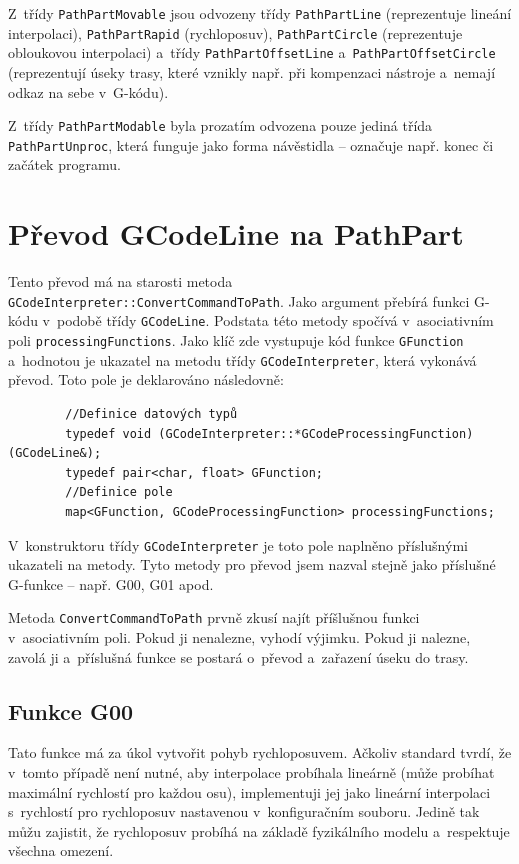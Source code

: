 		Z~třídy {\tt PathPartMovable} jsou odvozeny třídy {\tt PathPartLine} (reprezentuje lineání interpolaci), {\tt PathPartRapid} (rychloposuv), {\tt PathPartCircle} (reprezentuje obloukovou interpolaci) a~třídy {\tt PathPartOffsetLine} a~{\tt PathPartOffsetCircle} (reprezentují úseky trasy, které vznikly např. při kompenzaci nástroje a~nemají odkaz na sebe v~G-kódu).
		
		Z~třídy {\tt PathPartModable} byla prozatím odvozena pouze jediná třída {\tt PathPartUnproc}, která funguje jako forma návěstidla -- označuje např. konec či začátek programu.
	\section{Převod GCodeLine na PathPart}
		Tento převod má na starosti metoda {\tt GCodeInterpreter::ConvertCommandToPath}. Jako argument přebírá funkci G-kódu v~podobě třídy {\tt GCodeLine}. Podstata této metody spočívá v~asociativním poli {\tt processingFunctions}. Jako klíč zde vystupuje kód funkce {\tt GFunction} a~hodnotou je ukazatel na metodu třídy {\tt GCodeInterpreter}, která vykonává převod. Toto pole je deklarováno následovně:
		\begin{verbatim}
		//Definice datových typů
		typedef void (GCodeInterpreter::*GCodeProcessingFunction)(GCodeLine&);
		typedef pair<char, float> GFunction;
		//Definice pole
		map<GFunction, GCodeProcessingFunction> processingFunctions;
		\end{verbatim}
		V~konstruktoru třídy {\tt GCodeInterpreter} je toto pole naplněno příslušnými ukazateli na metody. Tyto metody pro převod jsem nazval stejně jako příslušné G-funkce -- např. G00, G01 apod.
		
		Metoda {\tt ConvertCommandToPath} prvně zkusí najít příšlušnou funkci v~asociativním poli. Pokud ji nenalezne, vyhodí výjimku. Pokud ji nalezne, zavolá ji a~příslušná funkce se postará o~převod a~zařazení úseku do trasy.
		
			\subsection{Funkce G00}
			Tato funkce má za úkol vytvořit pohyb rychloposuvem. Ačkoliv standard tvrdí, že v~tomto případě není nutné, aby interpolace probíhala lineárně (může probíhat maximální rychlostí pro každou osu), implementuji jej jako lineární interpolaci s~rychlostí pro rychloposuv nastavenou v~konfiguračním souboru. Jedině tak můžu zajistit, že rychloposuv probíhá na základě fyzikálního modelu a~respektuje všechna omezení.
			
